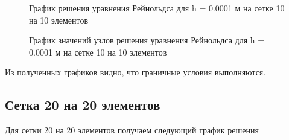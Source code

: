 \documentclass[12pt, a4paper]{article}
\begin{document}
\begin{figure}[!htbp]
	\caption{График решения уравнения Рейнольдса для h = 0.0001 м на сетке 10 на 10 элементов}
	\label{10x10mesh}
\end{figure}
\begin{figure}[!htbp]
		\caption{График значений узлов решения уравнения Рейнольдса для h = 0.0001 м на сетке 10 на 10 элементов}
	\label{10x10points}
\end{figure}

Из полученных графиков видно, что граничные условия выполняются.

\newpage

\subsection{Сетка 20 на 20 элементов}

Для сетки 20 на 20 элементов получаем следующий   график решения
\end{document}

